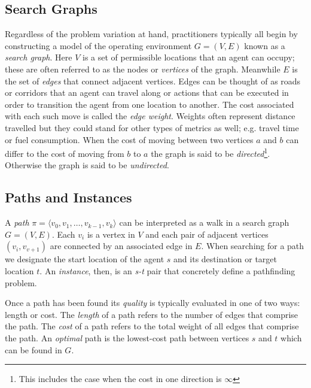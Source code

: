 \subsection{Search Graphs}
\label{cha::lit::problem::graphs}
Regardless of the problem variation at hand, practitioners typically all begin
by constructing a model of the operating environment $G = (V, E)$ known as a 
\emph{search graph}. Here $V$ is a set of permissible locations that an agent
can occupy; these are often referred to as the nodes or \emph{vertices} of the
graph. Meanwhile $E$ is the set of \emph{edges} that connect adjacent vertices.
Edges can be thought of as roads or corridors that an agent can travel along or
actions that can be executed in order to transition the agent from one location
to another.  The cost associated with each such move is called the \emph{edge
weight}.  Weights often represent distance travelled but they could stand for
other types of metrics as well; e.g.  travel time or fuel consumption.  When the
cost of moving between two vertices $a$ and $b$ can differ to the cost of moving
from $b$ to $a$ the graph is said to be \emph{directed}\footnote{This includes the
case when the cost in one direction is $\infty$}.  Otherwise 
the graph is said to be \emph{undirected}.


\subsection{Paths and Instances}
\label{cha::lit::problem::instance}
A \emph{path} $\pi = \langle v_0, v_1, \ldots, v_{k-1},  v_k \rangle$
can be interpreted as a walk in a search graph $G = (V, E)$.
Each $v_i$ is a vertex in $V$ and each pair of adjacent 
vertices $(v_i, v_{v+1})$ are connected by an associated edge in $E$.  
When searching for a path we designate the start location of the agent $s$ and 
its destination or target location $t$. An \emph{instance}, then, is an
\emph{s-t} pair that concretely define a pathfinding problem. 

Once a path has been found its \emph{quality} is typically evaluated in one of 
two ways: length or cost.
The \emph{length} of a path refers to the number of edges that comprise the path.
The \emph{cost} of a path refers to the total weight of all edges that comprise the path. 
An \emph{optimal} path is the lowest-cost path between vertices $s$ and $t$
which can be found in $G$.

